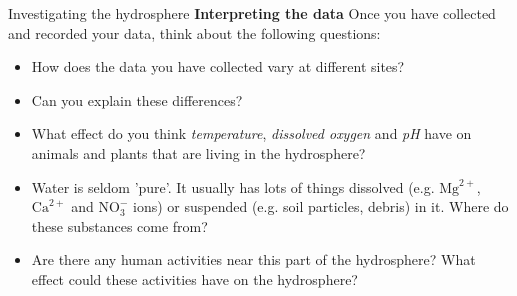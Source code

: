 \begin{Investigation}{Investigating the hydrosphere}
\textbf{Interpreting the data}
Once you have collected and recorded your data, think about the following questions:
\begin{itemize}[noitemsep]
\item How does the data you have collected vary at different sites?
\item Can you explain these differences?
\item What effect do you think \textsl{temperature}, \textsl{dissolved oxygen} and \textsl{pH} have on animals and plants that are living in the hydrosphere?
\item Water is seldom 'pure'. It usually has lots of things dissolved (e.g. ${\text{Mg}}^{2+}$, ${\text{Ca}}^{2+}$ and $\text{NO}_{3}^{-}$ ions) or suspended (e.g. soil particles, debris) in it. Where do these substances come from?
\item Are there any human activities near this part of the hydrosphere? What effect could these activities have on the hydrosphere?
\end{itemize}
\end{Investigation}

